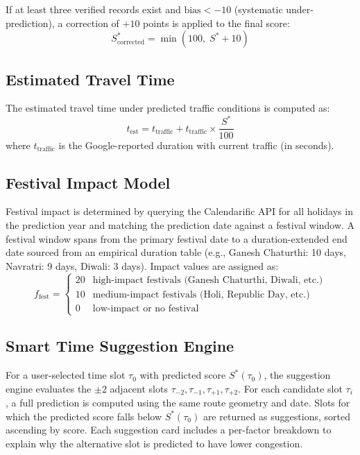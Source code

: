 \documentclass[conference]{IEEEtran}
\begin{document}
If at least three verified records exist and $\text{bias} < -10$ (systematic under-prediction), a correction of $+10$ points is applied to the final score:
\begin{equation}
S^*_{\text{corrected}} = \min(100,\; S^* + 10)
\label{eq:corrected}
\end{equation}

\subsection{Estimated Travel Time}

The estimated travel time under predicted traffic conditions is computed as:
\begin{equation}
t_{\text{est}} = t_{\text{traffic}} + t_{\text{traffic}} \times \frac{S^*}{100}
\label{eq:travel_time}
\end{equation}
where $t_{\text{traffic}}$ is the Google-reported duration with current traffic (in seconds).

\subsection{Festival Impact Model}

Festival impact is determined by querying the Calendarific API for all holidays in the prediction year and matching the prediction date against a festival window. A festival window spans from the primary festival date to a duration-extended end date sourced from an empirical duration table (e.g., Ganesh Chaturthi: 10 days, Navratri: 9 days, Diwali: 3 days). Impact values are assigned as:
\begin{equation}
f_{\text{fest}} =
\begin{cases}
20 & \text{high-impact festivals (Ganesh Chaturthi, Diwali, etc.)} \\
10 & \text{medium-impact festivals (Holi, Republic Day, etc.)} \\
0 & \text{low-impact or no festival}
\end{cases}
\label{eq:festival}
\end{equation}

\subsection{Smart Time Suggestion Engine}

For a user-selected time slot $\tau_0$ with predicted score $S^*(\tau_0)$, the suggestion engine evaluates the $\pm 2$ adjacent slots $\tau_{-2}, \tau_{-1}, \tau_{+1}, \tau_{+2}$. For each candidate slot $\tau_i$, a full prediction is computed using the same route geometry and date. Slots for which the predicted score falls below $S^*(\tau_0)$ are returned as suggestions, sorted ascending by score. Each suggestion card includes a per-factor breakdown to explain why the alternative slot is predicted to have lower congestion.
\end{document}

